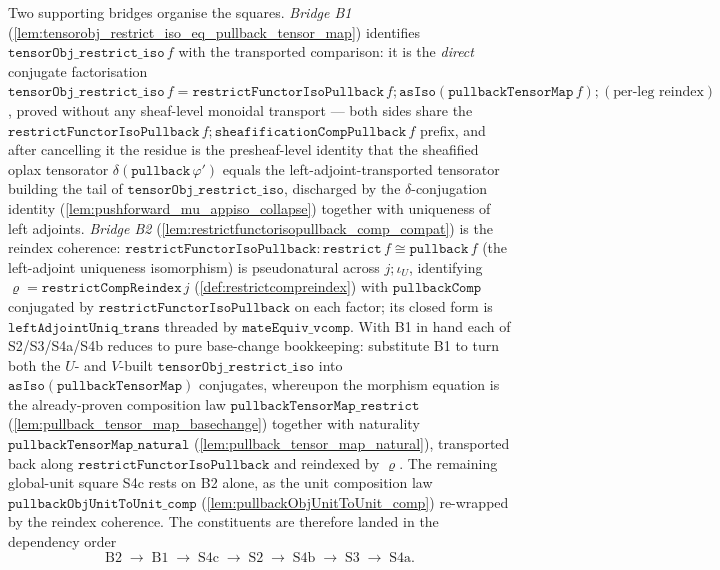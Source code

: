 Two supporting bridges organise the squares. \emph{Bridge B1}
(\cref{lem:tensorobj_restrict_iso_eq_pullback_tensor_map}) identifies
\(\mathtt{tensorObj\_restrict\_iso}\,f\) with the transported comparison: it is the
\emph{direct} conjugate factorisation
\(\mathtt{tensorObj\_restrict\_iso}\,f = \mathtt{restrictFunctorIsoPullback}\,f \mathbin{;}
\mathtt{asIso}(\mathtt{pullbackTensorMap}\,f) \mathbin{;} (\text{per-leg reindex})\),
proved without any sheaf-level monoidal transport --- both sides share the
\(\mathtt{restrictFunctorIsoPullback}\,f \mathbin{;} \mathtt{sheafificationCompPullback}\,f\)
prefix, and after cancelling it the residue is the presheaf-level identity that the
sheafified oplax tensorator \(\delta(\mathtt{pullback}\,\varphi')\) equals the
left-adjoint-transported tensorator building the tail of \(\mathtt{tensorObj\_restrict\_iso}\),
discharged by the \(\delta\)-conjugation identity
(\cref{lem:pushforward_mu_appiso_collapse}) together with uniqueness of left adjoints.
\emph{Bridge B2} (\cref{lem:restrictfunctorisopullback_comp_compat}) is the reindex
coherence: \(\mathtt{restrictFunctorIsoPullback} : \mathtt{restrict}\,f \cong \mathtt{pullback}\,f\)
(the left-adjoint uniqueness isomorphism) is pseudonatural across \(j \mathbin{;} \iota_U\),
identifying \(\varrho = \mathtt{restrictCompReindex}\,j\) (\cref{def:restrictcompreindex}) with
\(\mathtt{pullbackComp}\) conjugated by \(\mathtt{restrictFunctorIsoPullback}\) on each factor; its
closed form is \(\mathtt{leftAdjointUniq\_trans}\) threaded by \(\mathtt{mateEquiv\_vcomp}\).
With B1 in hand each of S2/S3/S4a/S4b reduces to pure base-change bookkeeping: substitute
B1 to turn both the \(U\)- and \(V\)-built \(\mathtt{tensorObj\_restrict\_iso}\) into
\(\mathtt{asIso}(\mathtt{pullbackTensorMap})\) conjugates, whereupon the morphism equation
is the already-proven composition law \(\mathtt{pullbackTensorMap\_restrict}\)
(\cref{lem:pullback_tensor_map_basechange}) together with naturality
\(\mathtt{pullbackTensorMap\_natural}\) (\cref{lem:pullback_tensor_map_natural}),
transported back along \(\mathtt{restrictFunctorIsoPullback}\) and reindexed by \(\varrho\).
The remaining global-unit square S4c rests on B2 alone, as the unit composition law
\(\mathtt{pullbackObjUnitToUnit\_comp}\) (\cref{lem:pullbackObjUnitToUnit_comp}) re-wrapped by the
reindex coherence. The constituents are therefore landed in the dependency order
\[
  \mathrm{B2} \;\to\; \mathrm{B1} \;\to\; \mathrm{S4c} \;\to\; \mathrm{S2}
    \;\to\; \mathrm{S4b} \;\to\; \mathrm{S3} \;\to\; \mathrm{S4a}.
\]

